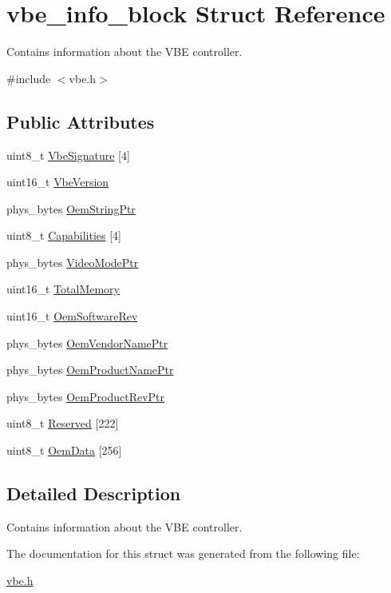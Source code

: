 \hypertarget{structvbe__info__block}{}\section{vbe\+\_\+info\+\_\+block Struct Reference}
\label{structvbe__info__block}


Contains information about the V\+BE controller.  




{\ttfamily \#include $<$vbe.\+h$>$}

\subsection*{Public Attributes}
\begin{DoxyCompactItemize}
\item 
uint8\+\_\+t \mbox{\hyperlink{group__vbe_ga06462d45a1a8ae45848b80cfa79444e8}{Vbe\+Signature}} \mbox{[}4\mbox{]}
\item 
uint16\+\_\+t \mbox{\hyperlink{group__vbe_gac7ab6c25271740667c6b14060618a3a6}{Vbe\+Version}}
\item 
phys\+\_\+bytes \mbox{\hyperlink{group__vbe_ga008fdeb52dea044bfddb0b77782aa45a}{Oem\+String\+Ptr}}
\item 
uint8\+\_\+t \mbox{\hyperlink{group__vbe_ga8b92a8e70de3ebac61f917778f3adca0}{Capabilities}} \mbox{[}4\mbox{]}
\item 
phys\+\_\+bytes \mbox{\hyperlink{group__vbe_gacd86a705c3f231d14694c29ca1794a90}{Video\+Mode\+Ptr}}
\item 
uint16\+\_\+t \mbox{\hyperlink{group__vbe_gab9cb5bcdc2958a986da30ba36b3be543}{Total\+Memory}}
\item 
uint16\+\_\+t \mbox{\hyperlink{group__vbe_ga2b59b9d6910c14c6293fbffbcf42523e}{Oem\+Software\+Rev}}
\item 
phys\+\_\+bytes \mbox{\hyperlink{group__vbe_gadc4a5de56bd1495087eaacb225260a52}{Oem\+Vendor\+Name\+Ptr}}
\item 
phys\+\_\+bytes \mbox{\hyperlink{group__vbe_gaca54b199c36b08ab53e0e919b00c68cd}{Oem\+Product\+Name\+Ptr}}
\item 
phys\+\_\+bytes \mbox{\hyperlink{group__vbe_ga77a46bfc82287324433f2bd8d17dd938}{Oem\+Product\+Rev\+Ptr}}
\item 
uint8\+\_\+t \mbox{\hyperlink{group__vbe_ga8e317dcd4697215e49f95fca709bc05e}{Reserved}} \mbox{[}222\mbox{]}
\item 
uint8\+\_\+t \mbox{\hyperlink{group__vbe_gabac031f88530417c8ccd8247159490dc}{Oem\+Data}} \mbox{[}256\mbox{]}
\end{DoxyCompactItemize}


\subsection{Detailed Description}
Contains information about the V\+BE controller. 

The documentation for this struct was generated from the following file\+:\begin{DoxyCompactItemize}
\item 
\mbox{\hyperlink{vbe_8h}{vbe.\+h}}\end{DoxyCompactItemize}
